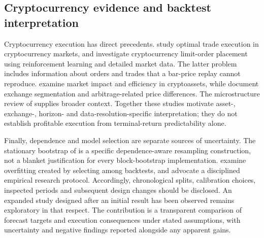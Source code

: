 \subsection{Cryptocurrency evidence and backtest interpretation}

Cryptocurrency execution has direct precedents. \citet{bundi2024} study optimal trade execution in cryptocurrency markets, and \citet{schnaubelt2022} investigate cryptocurrency limit-order placement using reinforcement learning and detailed market data. The latter problem includes information about orders and trades that a bar-price replay cannot reproduce. \citet{barucci2023} examine market impact and efficiency in cryptoassets, while \citet{makarov2020} document exchange segmentation and arbitrage-related price differences. The microstructure review of \citet{almeida2024} supplies broader context. Together these studies motivate asset-, exchange-, horizon- and data-resolution-specific interpretation; they do not establish profitable execution from terminal-return predictability alone.

Finally, dependence and model selection are separate sources of uncertainty. The stationary bootstrap of \citet{politis1994} is a specific dependence-aware resampling construction, not a blanket justification for every block-bootstrap implementation. \citet{bailey2017} examine overfitting created by selecting among backtests, and \citet{arnott2019} advocate a disciplined empirical research protocol. Accordingly, chronological splits, calibration choices, inspected periods and subsequent design changes should be disclosed. An expanded study designed after an initial result has been observed remains exploratory in that respect. The contribution is a transparent comparison of forecast targets and execution consequences under stated assumptions, with uncertainty and negative findings reported alongside any apparent gains.
